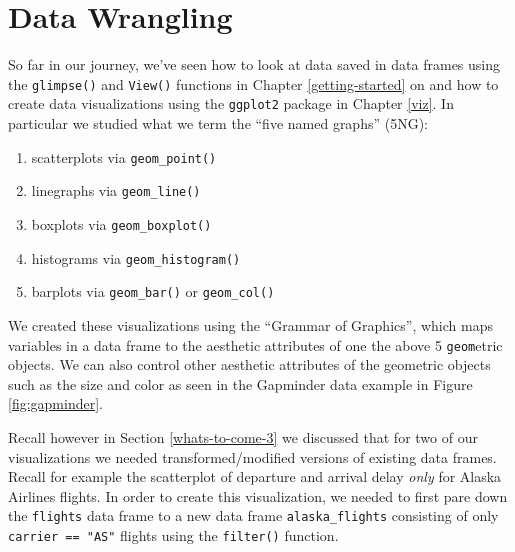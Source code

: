 \documentclass[12pt, krantz2,]{krantz}
\makeatletter
\newenvironment{Shaded}{\begin{snugshade}}{\end{snugshade}}
\newcommand{\DataTypeTok}[1]{\textcolor[rgb]{0.27,0.27,0.27}{#1}}
\newcommand{\KeywordTok}[1]{\textcolor[rgb]{0.27,0.27,0.27}{\textbf{#1}}}
\newcommand{\NormalTok}[1]{#1}
\newcommand{\OperatorTok}[1]{\textcolor[rgb]{0.43,0.43,0.43}{\textbf{#1}}}
\newcommand{\StringTok}[1]{\textcolor[rgb]{0.5,0.5,0.5}{#1}}
\providecommand{\tightlist}{%
  \setlength{\itemsep}{0pt}\setlength{\parskip}{0pt}}
\newenvironment{kframe}{%
\medskip{}
\setlength{\fboxsep}{.8em}
 \def\at@end@of@kframe{}%
 \ifinner\ifhmode%
  \def\at@end@of@kframe{\end{minipage}}%
  \begin{minipage}{\columnwidth}%
 \fi\fi%
 \def\FrameCommand##1{\hskip\@totalleftmargin \hskip-\fboxsep
 \colorbox{shadecolor}{##1}\hskip-\fboxsep
     \hskip-\linewidth \hskip-\@totalleftmargin \hskip\columnwidth}%
 \MakeFramed {\advance\hsize-\width
   \@totalleftmargin\z@ \linewidth\hsize
   \@setminipage}}%
 {\par\unskip\endMakeFramed%
 \at@end@of@kframe}
\renewenvironment{Shaded}{\begin{kframe}}{\end{kframe}}
\makeatother
\begin{document}
\hypertarget{wrangling}{%
\chapter{Data Wrangling}\label{wrangling}}

So far in our journey, we've seen how to look at data saved in data frames using the \texttt{glimpse()} and \texttt{View()} functions in Chapter \ref{getting-started} on and how to create data visualizations using the \texttt{ggplot2} package in Chapter \ref{viz}. In particular we studied what we term the ``five named graphs'' (5NG):

\begin{enumerate}
\def\labelenumi{\arabic{enumi}.}
\tightlist
\item
  scatterplots via \texttt{geom\_point()}
\item
  linegraphs via \texttt{geom\_line()}
\item
  boxplots via \texttt{geom\_boxplot()}
\item
  histograms via \texttt{geom\_histogram()}
\item
  barplots via \texttt{geom\_bar()} or \texttt{geom\_col()}
\end{enumerate}

We created these visualizations using the ``Grammar of Graphics'', which maps variables in a data frame to the aesthetic attributes of one the above 5 \texttt{geom}etric objects. We can also control other aesthetic attributes of the geometric objects such as the size and color as seen in the Gapminder data example in Figure \ref{fig:gapminder}.

Recall however in Section \ref{whats-to-come-3} we discussed that for two of our visualizations we needed transformed/modified versions of existing data frames. Recall for example the scatterplot of departure and arrival delay \emph{only} for Alaska Airlines flights. In order to create this visualization, we needed to first pare down the \texttt{flights} data frame to a new data frame \texttt{alaska\_flights} consisting of only \texttt{carrier\ ==\ "AS"} flights using the \texttt{filter()} function.

\begin{Shaded}
\end{Shaded}
\end{document}
